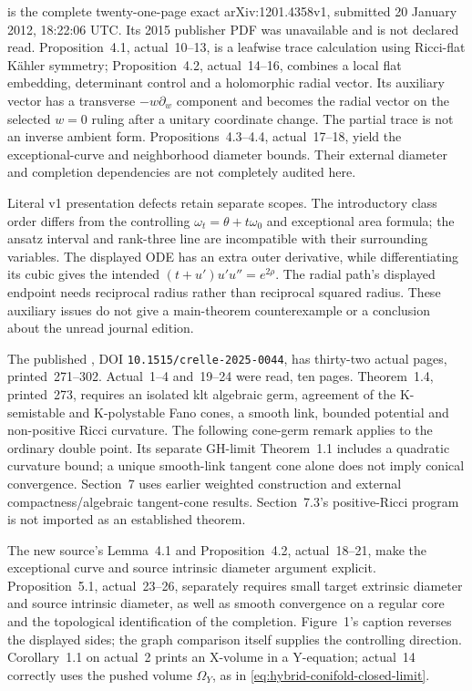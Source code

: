 \cite{Song12ConifoldV1} is the complete twenty-one-page exact
arXiv:1201.4358v1, submitted 20 January 2012, 18:22:06 UTC.
Its 2015 publisher PDF was unavailable and is not declared read.
Proposition~4.1, actual~10--13, is a leafwise trace calculation
using Ricci-flat K\"ahler symmetry; Proposition~4.2, actual~14--16,
combines a local flat embedding, determinant control and a
holomorphic radial vector. Its auxiliary vector has a transverse
\(-w\partial_w\) component and becomes the radial vector on
the selected \(w=0\) ruling after a unitary coordinate change.
The partial trace is not an inverse ambient form.
Propositions~4.3--4.4, actual~17--18, yield the exceptional-curve
and neighborhood diameter bounds. Their external diameter and
completion dependencies are not completely audited here.

Literal v1 presentation defects retain separate scopes. The
introductory class order differs from the controlling
\(\omega_t=\theta+t\omega_0\) and exceptional area formula;
the ansatz interval and rank-three line are incompatible with
their surrounding variables. The displayed ODE has an extra outer
derivative, while differentiating its cubic gives the intended
\((t+u')u'u''=e^{2\rho}\). The radial path's displayed endpoint
needs reciprocal radius rather than reciprocal squared radius.
These auxiliary issues do not give a main-theorem counterexample
or a conclusion about the unread journal edition.

The published \cite{Zhang25TangentConesPublished}, DOI
\nolinkurl{10.1515/crelle-2025-0044}, has thirty-two actual pages,
printed~271--302. Actual~1--4 and~19--24 were read, ten pages.
Theorem~1.4, printed~273, requires an isolated klt algebraic germ,
agreement of the K-semistable and K-polystable Fano cones, a
smooth link, bounded potential and non-positive Ricci curvature.
The following cone-germ remark applies to the ordinary double
point. Its separate GH-limit Theorem~1.1 includes a quadratic
curvature bound; a unique smooth-link tangent cone alone does
not imply conical convergence. Section~7 uses earlier weighted
construction and external compactness/algebraic tangent-cone
results. Section~7.3's positive-Ricci program is not imported as
an established theorem.

The new source's Lemma~4.1 and Proposition~4.2, actual~18--21,
make the exceptional curve and source intrinsic diameter argument
explicit. Proposition~5.1, actual~23--26, separately requires
small target extrinsic diameter and source intrinsic diameter,
as well as smooth convergence on a regular core and the
topological identification of the completion. Figure~1's caption
reverses the displayed sides; the graph comparison itself supplies
the controlling direction. Corollary~1.1 on actual~2 prints an
X-volume in a Y-equation; actual~14 correctly uses the pushed
volume \(\Omega_Y\), as in \eqref{eq:hybrid-conifold-closed-limit}.

